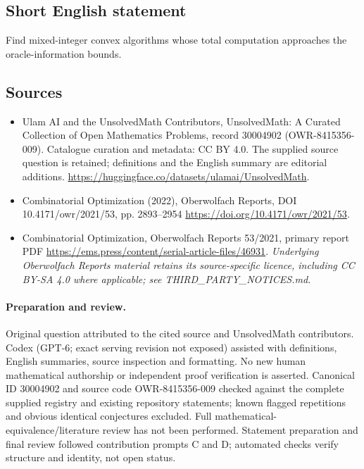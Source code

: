\documentclass[11pt]{article}
\begin{document}
\subsection{Short English statement}
Find mixed-integer convex algorithms whose total computation approaches the oracle-information bounds.
\subsection{Sources}
\begin{itemize}
\item[\hypertarget{source:30004902:1}{S1}] Ulam AI and the UnsolvedMath Contributors, UnsolvedMath: A Curated Collection of Open Mathematics Problems, record 30004902 (OWR-8415356-009). Catalogue curation and metadata: CC BY 4.0. The supplied source question is retained; definitions and the English summary are editorial additions.
\url{https://huggingface.co/datasets/ulamai/UnsolvedMath}.
\item[\hypertarget{source:30004902:2}{S2}] Combinatorial Optimization (2022), Oberwolfach Reports, DOI 10.4171/owr/2021/53, pp. 2893--2954
\url{https://doi.org/10.4171/owr/2021/53}.
\item[\hypertarget{source:30004902:3}{S3}] Combinatorial Optimization, Oberwolfach Reports 53/2021, primary report PDF
\url{https://ems.press/content/serial-article-files/46931}.
\textit{Underlying Oberwolfach Reports material retains its source-specific licence, including CC BY-SA 4.0 where applicable; see THIRD\_PARTY\_NOTICES.md.}
\end{itemize}
\paragraph{Preparation and review.}
Original question attributed to the cited source and UnsolvedMath contributors. Codex (GPT-6; exact serving revision not exposed) assisted with definitions, English summaries, source inspection and formatting. No new human mathematical authorship or independent proof verification is asserted. Canonical ID 30004902 and source code OWR-8415356-009 checked against the complete supplied registry and existing repository statements; known flagged repetitions and obvious identical conjectures excluded. Full mathematical-equivalence/literature review has not been performed. Statement preparation and final review followed contribution prompts C and D; automated checks verify structure and identity, not open status.
\label{end:30004902}
\end{document}
